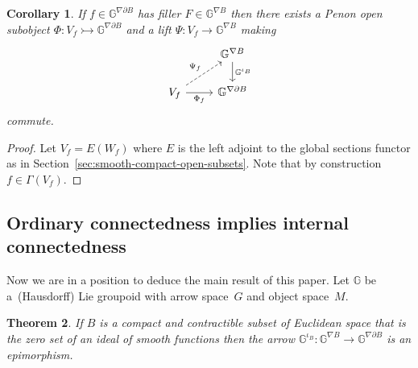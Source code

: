 \documentclass[pdftex]{sigma}
\numberwithin{equation}{section}
\newtheorem{Theorem}{Theorem}[section]
\newtheorem{Corollary}[Theorem]{Corollary}
\begin{document}
\begin{Corollary}\label{main-lemma}
If $f\in \mathbb{G}^{\nabla\partial B}$ has filler $F\in \mathbb{G}^{\nabla B}$ then there exists a Penon open subobject $\Phi\colon V_f\rightarrowtail \mathbb{G}^{\nabla\partial B}$ and a lift $\Psi\colon V_f\rightarrow \mathbb{G}^{\nabla B}$ making
\begin{equation*}\begin{tikzcd}
& \mathbb{G}^{\nabla B} \dar{\mathbb{G}^{\iota_B}} \\
V_f \rar[swap]{\Phi_f} \urar[dashed]{\Psi_f} & \mathbb{G}^{\nabla\partial B}
\end{tikzcd}\end{equation*}
 commute.
\end{Corollary}
\begin{proof}Let $V_f=E(W_f)$ where $E$ is the left adjoint to the global sections functor as in Section~\ref{sec:smooth-compact-open-subsets}. Note that by construction $f\in \Gamma(V_f)$.
\end{proof}

\subsection{Ordinary connectedness implies internal connectedness}\label{sec:ordinary-connectedness-implies-enriched}

Now we are in a position to deduce the main result of this paper. Let $\mathbb{G}$ be a~(Hausdorf\/f) Lie groupoid with arrow space~$G$ and object space~$M$.

\begin{Theorem} If $B$ is a compact and contractible subset of Euclidean space that is the zero set of an ideal of smooth functions then the arrow $\mathbb{G}^{\iota_B}\colon \mathbb{G}^{\nabla B} \rightarrow \mathbb{G}^{\nabla\partial B}$ is an epimorphism.
\end{Theorem}
\end{document}
